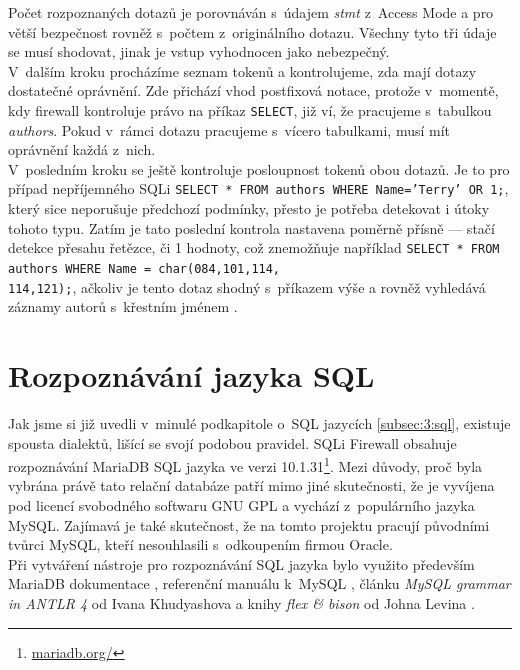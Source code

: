 Počet rozpoznaných dotazů je porovnáván s~údajem \textit{stmt} z~Access Mode a pro větší bezpečnost rovněž s~počtem z~originálního dotazu. 
Všechny tyto tři údaje se musí shodovat, jinak je vstup vyhodnocen jako nebezpečný. \\

V~dalším kroku procházíme seznam tokenů a kontrolujeme, zda mají dotazy dostatečné oprávnění. Zde přichází vhod postfixová notace, protože
v~momentě, kdy firewall kontroluje právo na příkaz \texttt{SELECT}, již ví, že pracujeme s~tabulkou \textit{authors}. Pokud v~rámci dotazu pracujeme s~vícero
tabulkami, musí mít oprávnění každá z~nich. \\

V~posledním kroku se ještě kontroluje posloupnost tokenů obou dotazů. Je to pro případ nepříjemného SQLi 
\texttt{SELECT * FROM authors WHERE Name='Terry' OR 1;}, který sice neporušuje předchozí podmínky, přesto je potřeba detekovat i útoky tohoto typu.
Zatím je tato poslední kontrola nastavena poměrně přísně --- stačí detekce přesahu řetězce, či 1 hodnoty, což znemožňuje například 
\texttt{SELECT * FROM authors WHERE Name = char(084,101,114,\\114,121);}, ačkoliv je tento dotaz shodný s~příkazem výše a rovněž vyhledává záznamy
autorů s~křestním jménem . 

\section{Rozpoznávání jazyka SQL} \label{sec:6:parser}
Jak jsme si již uvedli v~minulé podkapitole o~SQL jazycích \ref{subsec:3:sql}, existuje spousta dialektů, lišící se svojí podobou pravidel.
SQLi Firewall obsahuje rozpoznávání MariaDB SQL jazyka ve verzi 10.1.31\footnote{\url{mariadb.org/}}. Mezi důvody, proč byla vybrána právě tato relační 
databáze patří mimo jiné skutečnosti, že je vyvíjena pod licencí svobodného softwaru GNU GPL a vychází z~populárního jazyka MySQL.
Zajímavá je také skutečnost, že na tomto projektu pracují původními tvůrci MySQL, kteří nesouhlasili s~odkoupením firmou Oracle. \\

Při vytváření nástroje pro rozpoznávání SQL jazyka bylo využito především MariaDB dokumentace \cite{MariaDB}, referenční manuálu k~MySQL \cite{MySQL},
článku \textit{MySQL grammar in ANTLR 4} od Ivana Khudyashova \cite{Khudyashov2018} a knihy \textit{flex \& bison} od Johna Levina \cite{levine2009}. \\

